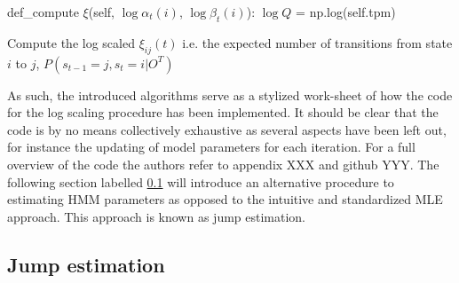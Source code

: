 \newpage
\begin{algorithm}[H]
def\_compute $\xi$(self, $\log\alpha_t(i)$, $\log\beta_t(i)$): \;
\Indp 
$\log Q$ = np.log(self.tpm) \;
\BlankLine


\caption{Compute the log scaled $\xi_{ij}(t)$ i.e. the expected number of transitions from state $i$ to $j$, $P(s_{t-1} = j, s_t = i |O^T)$}
\label{algo: log_scaled_xi}
\end{algorithm}

As such, the introduced algorithms serve as a stylized work-sheet of how the code for the log scaling procedure has been implemented. It should be clear that the code is by no means collectively exhaustive as several aspects have been left out, for instance the updating of model parameters for each iteration. For a full overview of the code the authors refer to appendix XXX and github YYY. The following section labelled \ref{subsection: Jump theory} will introduce an alternative procedure to estimating HMM parameters as opposed to the intuitive and standardized MLE approach. This approach is known as jump estimation.

\subsection{Jump estimation}
\label{subsection: Jump theory}

